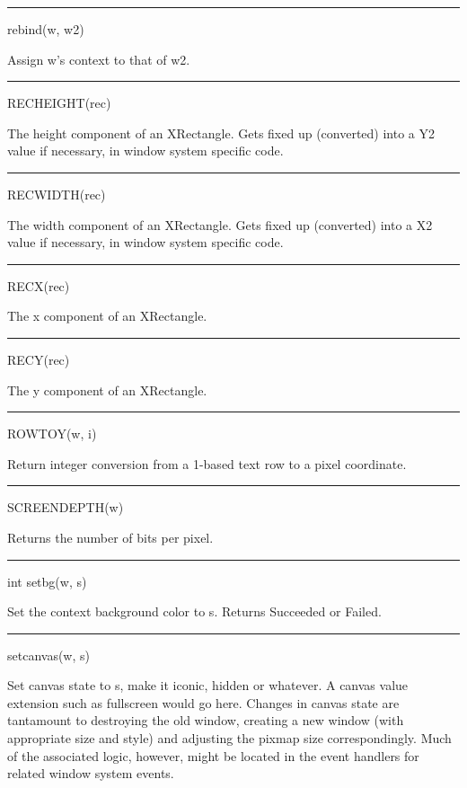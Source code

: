 \bigskip\hrule\vspace{0.1cm}
\noindent
rebind(w, w2)


Assign w's context to that of w2.


\bigskip\hrule\vspace{0.1cm}
\noindent
RECHEIGHT(rec)


The height component of an XRectangle. Gets {\textquotedbl}fixed
up{\textquotedbl} (converted) into a Y2 value if necessary, in window
system specific code.


\bigskip\hrule\vspace{0.1cm}
\noindent
RECWIDTH(rec)


The width component of an XRectangle. Gets {\textquotedbl}fixed
up{\textquotedbl} (converted) into a X2 value if necessary, in window
system specific code.


\bigskip\hrule\vspace{0.1cm}
\noindent
RECX(rec)


The x component of an XRectangle.


\bigskip\hrule\vspace{0.1cm}
\noindent
RECY(rec)


The y component of an XRectangle.


\bigskip\hrule\vspace{0.1cm}
\noindent
ROWTOY(w, i)


Return integer conversion from a 1-based text row to a pixel coordinate.


\bigskip\hrule\vspace{0.1cm}
\noindent
SCREENDEPTH(w)


Returns the number of bits per pixel.


\bigskip\hrule\vspace{0.1cm}
\noindent
int setbg(w, s)


Set the context background color to \textsf{s}. Returns
\textsf{Succeeded} or \textsf{Failed}.


\bigskip\hrule\vspace{0.1cm}
\noindent
setcanvas(w, s)


Set canvas state to \textsf{s}, make it
\textsf{{\textquotedbl}iconic{\textquotedbl}},
\textsf{{\textquotedbl}hidden{\textquotedbl}} or whatever. A canvas
value extension such as fullscreen would go here.  Changes in canvas
state are tantamount to destroying the old window, creating a new
window (with appropriate size and style) and adjusting the pixmap size
correspondingly. Much of the associated logic, however, might be
located in the event handlers for related window system events.


